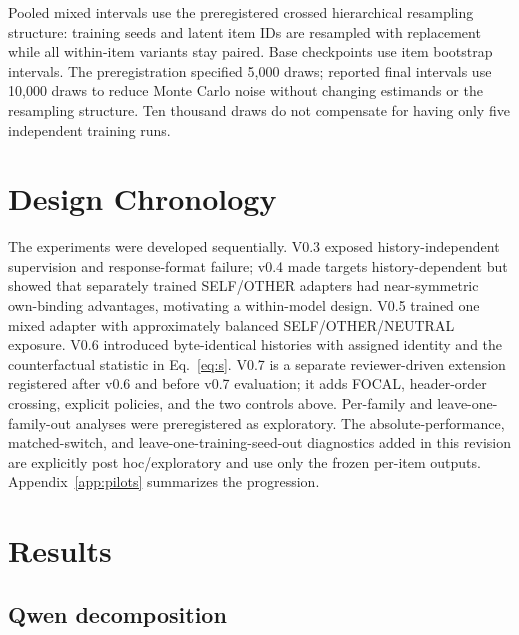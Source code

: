 \documentclass{article}
\begin{document}
Pooled mixed intervals use the preregistered crossed hierarchical resampling structure: training seeds and latent item IDs are resampled with replacement while all within-item variants stay paired. Base checkpoints use item bootstrap intervals. The preregistration specified 5,000 draws; reported final intervals use 10,000 draws to reduce Monte Carlo noise without changing estimands or the resampling structure. Ten thousand draws do not compensate for having only five independent training runs.

\section{Design Chronology}
\label{sec:prereg}

The experiments were developed sequentially. V0.3 exposed history-independent supervision and response-format failure; v0.4 made targets history-dependent but showed that separately trained SELF/OTHER adapters had near-symmetric own-binding advantages, motivating a within-model design. V0.5 trained one mixed adapter with approximately balanced SELF/OTHER/NEUTRAL exposure. V0.6 introduced byte-identical histories with assigned identity and the counterfactual statistic in Eq.~\ref{eq:s}. V0.7 is a separate reviewer-driven extension registered after v0.6 and before v0.7 evaluation; it adds FOCAL, header-order crossing, explicit policies, and the two controls above. Per-family and leave-one-family-out analyses were preregistered as exploratory. The absolute-performance, matched-switch, and leave-one-training-seed-out diagnostics added in this revision are explicitly post hoc/exploratory and use only the frozen per-item outputs. Appendix~\ref{app:pilots} summarizes the progression.

\section{Results}
\label{sec:results}

\subsection{Qwen decomposition}
\end{document}
